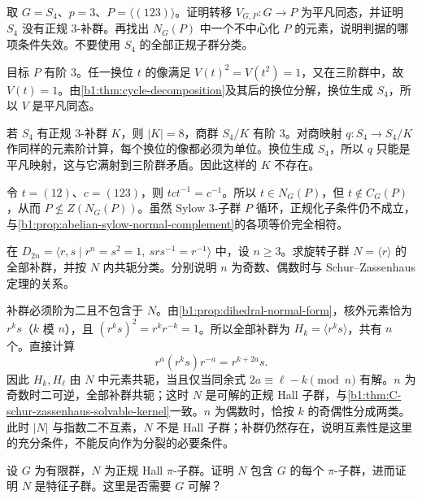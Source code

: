 \begin{exercise}\label{b1:ex:C-transfer-symmetric-four-obstruction}
	取 \(G=S_4\)、\(p=3\)、\(P=\langle(123)\rangle\)。证明转移 \(V_{G,P}:G\rightarrow P\) 为平凡同态，并证明 \(S_4\) 没有正规 \(3\)-补群。再找出 \(N_G(P)\) 中一个不中心化 \(P\) 的元素，说明判据的哪项条件失效。不要使用 \(S_4\) 的全部正规子群分类。
\end{exercise}

\begin{solution}
	目标 \(P\) 有阶 \(3\)。任一换位 \(t\) 的像满足 \(V(t)^2=V(t^2)=1\)，又在三阶群中，故 \(V(t)=1\)。由\cref{b1:thm:cycle-decomposition}及其后的换位分解，换位生成 \(S_4\)，所以 \(V\) 是平凡同态。

	若 \(S_4\) 有正规 \(3\)-补群 \(K\)，则 \(|K|=8\)，商群 \(S_4/K\) 有阶 \(3\)。对商映射 \(q:S_4\rightarrow S_4/K\) 作同样的元素阶计算，每个换位的像都必须为单位。换位生成 \(S_4\)，所以 \(q\) 只能是平凡映射，这与它满射到三阶群矛盾。因此这样的 \(K\) 不存在。

	令 \(t=(12)\)、\(c=(123)\)，则 \(tct^{-1}=c^{-1}\)。所以 \(t\in N_G(P)\)，但 \(t\notin C_G(P)\)，从而 \(P\nleq Z(N_G(P))\)。虽然 Sylow \(3\)-子群 \(P\) 循环，正规化子条件仍不成立，与\cref{b1:prop:abelian-sylow-normal-complement}的各项等价完全相符。
\end{solution}

\begin{exercise}\label{b1:ex:C-dihedral-complements}
	在 \(D_{2n}=\langle r,s\mid r^n=s^2=1,\ srs^{-1}=r^{-1}\rangle\) 中，设 \(n\geq3\)。求旋转子群 \(N=\langle r\rangle\) 的全部补群，并按 \(N\) 内共轭分类。分别说明 \(n\) 为奇数、偶数时与 Schur–Zassenhaus 定理的关系。
\end{exercise}

\begin{solution}
	补群必须阶为二且不包含于 \(N\)。由\cref{b1:prop:dihedral-normal-form}，核外元素恰为 \(r^ks\)（\(k\) 模 \(n\)），且 \((r^ks)^2=r^kr^{-k}=1\)。所以全部补群为 \(H_k=\langle r^ks\rangle\)，共有 \(n\) 个。直接计算
	\[
		r^a(r^ks)r^{-a}=r^{k+2a}s.
	\]
	因此 \(H_k,H_\ell\) 由 \(N\) 中元素共轭，当且仅当同余式 \(2a\equiv\ell-k\pmod n\) 有解。\(n\) 为奇数时二可逆，全部补群共轭；这时 \(N\) 是可解的正规 Hall 子群，与\cref{b1:thm:C-schur-zassenhaus-solvable-kernel}一致。\(n\) 为偶数时，恰按 \(k\) 的奇偶性分成两类。此时 \(|N|\) 与指数二不互素，\(N\) 不是 Hall 子群；补群仍然存在，说明互素性是这里的充分条件，不能反向作为分裂的必要条件。
\end{solution}

\begin{exercise}\label{b1:ex:C-normal-hall-characteristic}
	设 \(G\) 为有限群，\(N\) 为正规 Hall \(\pi\)-子群。证明 \(N\) 包含 \(G\) 的每个 \(\pi\)-子群，进而证明 \(N\) 是特征子群。这里是否需要 \(G\) 可解？
\end{exercise}

